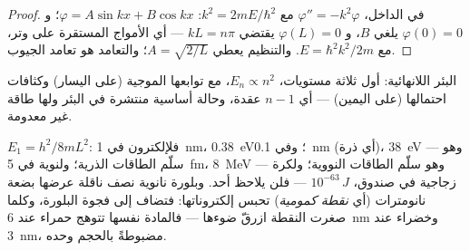 \begin{proof}
في الداخل، $\varphi'' = -k^2\varphi$ مع $k^2 = 2mE/\hbar^2$: $\varphi = A\sin kx
+ B\cos kx$؛ و $\varphi(0) = 0$ يلغي $B$، و $\varphi(L) = 0$ يقتضي $kL = n\pi$
--- أي الأمواج المستقرة على وتر، مع $E = \hbar^2k^2/2m$.
والتنظيم يعطي $A = \sqrt{2/L}$؛ والتعامد هو تعامد
الجيوب.
\end{proof}

\begin{omfigure}

{\small البئر اللانهائية: أول ثلاثة مستويات، $E_n \propto n^2$،
مع توابعها الموجية (على اليسار) وكثافات احتمالها (على اليمين) ---
أي $n - 1$ عقدة، وحالة أساسية منتشرة في البئر
ولها طاقة غير معدومة.}
\end{omfigure}

\begin{example}\label{ex:b2:potential-wells-tunneling:orders}
$E_1 = h^2/8mL^2$: فلإلكترون في \qty{1}{nm}، \qty{0.38}{eV}؛ وفي
\qty{0.1}{nm} (أي ذرة)، \qty{38}{eV} --- وهو سلّم الطاقات الذرية؛ ولنوية
في \qty{5}{fm}، \qty{8}{MeV} --- وهو سلّم الطاقات النووية؛ ولكرة
زجاجية في صندوق، $10^{-63}\,\unit{J}$ --- فلن يلاحظ أحد. وبلورة
نانوية نصف ناقلة عرضها بضعة نانومترات (أي \emph{نقطة
كمومية}) تحبس إلكتروناتها: فتضاف  إلى
فجوة البلورة، وكلما صغرت النقطة ازرقّ ضوءها ---
فالمادة نفسها تتوهج حمراء عند \qty{6}{nm} وخضراء عند \qty{3}{nm}،
مضبوطةً بالحجم وحده.
\end{example}

